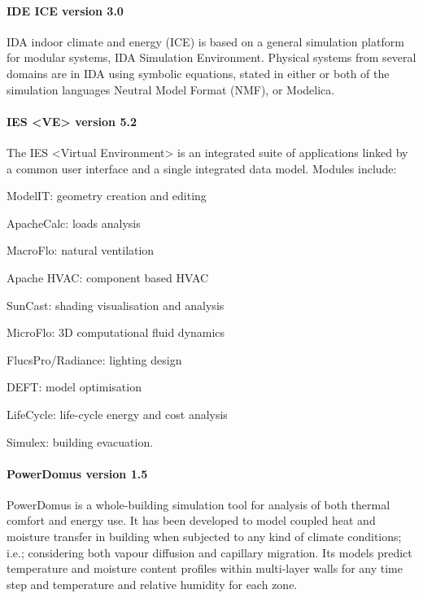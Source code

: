 \paragraph{IDE ICE version 3.0} IDA indoor climate and energy (ICE) is based on a general simulation platform for modular systems, IDA Simulation Environment. Physical systems from several domains are in IDA using symbolic equations, stated in either or both of the simulation languages Neutral Model Format (NMF), or Modelica.

\paragraph{IES <VE> version 5.2} The IES <Virtual Environment> is an integrated suite of applications linked by a common user interface and a single integrated data model. Modules include:
\begin{inparaenum}
\item ModelIT: geometry creation and editing
\item ApacheCalc: loads analysis
\item MacroFlo: natural ventilation
\item Apache HVAC: component based HVAC
\item SunCast: shading visualisation and analysis
\item MicroFlo: 3D computational fluid dynamics 
\item FlucsPro/Radiance: lighting design
\item DEFT: model optimisation 
\item LifeCycle: life-cycle energy and cost analysis
\item Simulex: building evacuation. 
\end{inparaenum}

\paragraph{PowerDomus version 1.5} PowerDomus is a whole-building simulation tool for analysis of both thermal comfort and energy use. It has been developed to model coupled heat and moisture transfer in building when subjected to any kind of climate conditions; i.e.; considering both vapour diffusion and capillary migration. Its models predict temperature and moisture content profiles within multi-layer walls for any time step and temperature and relative humidity for each zone.

